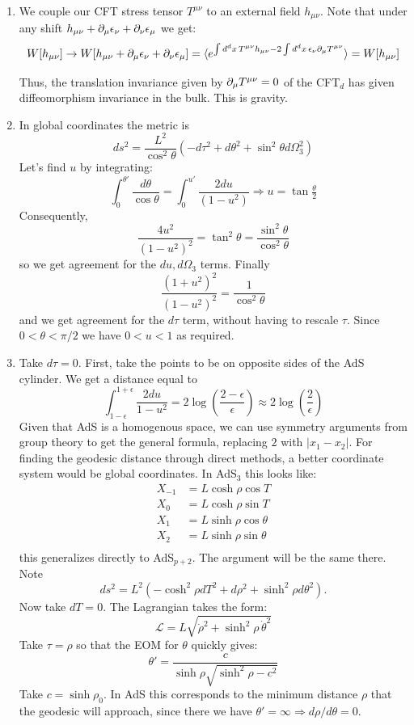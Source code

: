 \documentclass[11pt, class=article, crop=false]{standalone}
\begin{document}
\begin{enumerate}
	\item We couple our CFT stress tensor $T^{\mu \nu}$ to an external field $h_{\mu \nu}$. Note that under any shift $h_{\mu \nu} + \partial_\mu \epsilon_\nu + \partial_\nu \epsilon_\mu$ we get:
	\[
		W[h_{\mu \nu}] \to W[h_{\mu \nu} + \partial_\mu \epsilon_\nu + \partial_\nu \epsilon_\mu] = \braket{e^{\int d^d x\, T^{\mu \nu} h_{\mu \nu}- 2 \int d^d x\, \epsilon_\nu \partial_\mu T^{\mu \nu}}} = W[h_{\mu \nu}]
	\]
	
	Thus, the translation invariance given by $\partial_\mu T^{\mu \nu} = 0$ of the CFT$_d$ has given diffeomorphism invariance in the bulk. This is gravity. 
	
	\item In global coordinates the metric is
	\[
		ds^2 = \frac{L^2}{\cos^2 \theta} \left(-d\tau^2 + d \theta^2 + \sin^2 \theta d\Omega_3^2 \right)
	\]
	Let's find $u$ by integrating:
	\[
		\int_0^{\theta'} \frac{d\theta}{\cos \theta} = \int_0^{u'} \frac{2 du}{(1-u^2)} \Rightarrow u = \tan \tfrac\theta2
	\]
	Consequently,
	\[
		\frac{4 u^2}{(1-u^2)^2} = \tan^2 \theta = \frac{\sin^2 \theta}{\cos^2 \theta}
	\]
	so we get agreement for the $du, d\Omega_3$ terms. Finally
	\[
		\frac{(1+u^2)^2}{(1-u^2)^2} = \frac{1}{\cos^2 \theta}
	\]
	and we get agreement for the $d\tau$ term, without having to rescale $\tau$. Since $0 < \theta < \pi/2$ we have $0 < u < 1$ as required. 
	
	\item Take $d\tau = 0$. First, take the points to be on opposite sides of the AdS cylinder. We get a distance equal to
	\[
		\int_{1-\epsilon}^{1+\epsilon} \frac{2 du}{1-u^2} = 2 \log\left(\frac{2-\epsilon}{\epsilon}\right) \approx 2 \log\left(\frac{2}{\epsilon}\right)
	\]
	Given that AdS is a homogenous space, we can use symmetry arguments from group theory to get the general formula, replacing $2$ with $|x_1 - x_2|$. For finding the geodesic distance through direct methods, a better coordinate system would be global coordinates. In AdS$_3$ this looks like:
	\[
	\begin{aligned}
		X_{-1} &= L \cosh \rho \cos T\\
		X_{0} &= L \cosh \rho \sin T\\
		X_{1} &= L \sinh \rho \cos \theta\\
		X_{2} &= L \sinh \rho \sin \theta\\
	\end{aligned}
	\] 
	this generalizes directly to AdS$_{p+2}$. The argument will be the same there. Note 
	\[
		ds^2 = L^2 (-\cosh^2 \rho dT^2 + d\rho^2 + \sinh^2 \rho d\theta^2).
	\]
	Now take $dT= 0$. The Lagrangian takes the form:
	\[
		\mathcal L = L \sqrt{\dot \rho^2 + \sinh^2 \rho \, \dot \theta^2}
	\]
	Take $\tau = \rho$ so that the EOM for $\theta$ quickly gives:
	\[
		\theta' = \frac{c}{\sinh \rho \sqrt{\sinh^2 \rho - c^2}}
	\]
	Take $c = \sinh \rho_0$. In AdS this corresponds to the minimum distance $\rho$ that the geodesic will approach, since there we have $\theta' = \infty \Rightarrow d\rho/d\theta = 0$.
	

\end{enumerate}
\end{document}
